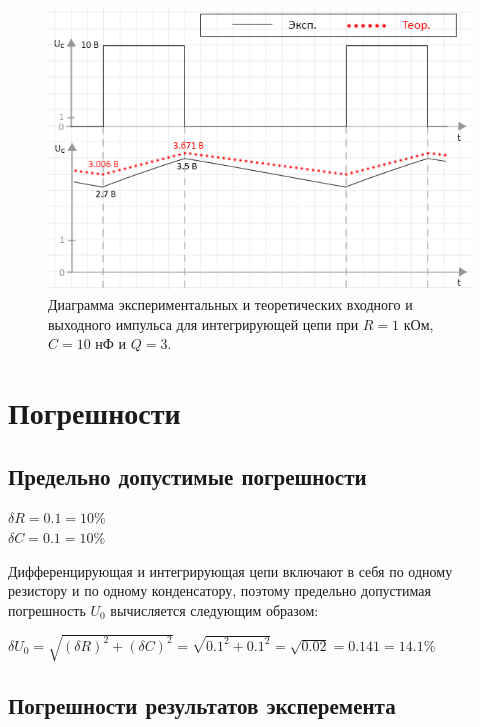 \begin{figure}[H]
	\begin{center}
		\includegraphics[width=14cm]{img/q3_with_theory}
		\caption{Диаграмма экспериментальных и теоретических входного и выходного импульса для интегрирующей цепи при $R = 1$ кОм, $C = 10$ нФ и $Q = 3$.}
		\label{i:3} %
	\end{center}
\end{figure}

\section{Погрешности}

\subsection{Предельно допустимые погрешности}

\begin{center}
$\delta R = 0.1 = 10\%$\\
$\delta C = 0.1 = 10\%$\\
\end{center}

Дифференцирующая и интегрирующая цепи включают в себя по одному резистору и по одному конденсатору, поэтому предельно допустимая погрешность $U_0$ вычисляется следующим образом:


$\delta U_0 = \sqrt{(\delta R)^2 + (\delta C)^2} = \sqrt{0.1^2 + 0.1^2} = \sqrt{0.02} = 0.141 = 14.1 \%$

\subsection{Погрешности результатов эксперемента} %

